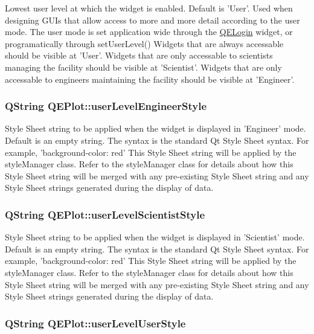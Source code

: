 Lowest user level at which the widget is enabled. Default is 'User'. Used when designing GUIs that allow access to more and more detail according to the user mode. The user mode is set application wide through the \hyperlink{classQELogin}{QELogin} widget, or programatically through setUserLevel() Widgets that are always accessable should be visible at 'User'. Widgets that are only accessable to scientists managing the facility should be visible at 'Scientist'. Widgets that are only accessable to engineers maintaining the facility should be visible at 'Engineer'. \hypertarget{classQEPlot_ad3827c125cb4f43a333b3cfbaa14bf16}{
\subsubsection[{userLevelEngineerStyle}]{\setlength{\rightskip}{0pt plus 5cm}QString QEPlot::userLevelEngineerStyle}}
\label{classQEPlot_ad3827c125cb4f43a333b3cfbaa14bf16}
Style Sheet string to be applied when the widget is displayed in 'Engineer' mode. Default is an empty string. The syntax is the standard Qt Style Sheet syntax. For example, 'background-\/color: red' This Style Sheet string will be applied by the styleManager class. Refer to the styleManager class for details about how this Style Sheet string will be merged with any pre-\/existing Style Sheet string and any Style Sheet strings generated during the display of data. \hypertarget{classQEPlot_a9c6651e019989197a0e952c8348e4215}{
\subsubsection[{userLevelScientistStyle}]{\setlength{\rightskip}{0pt plus 5cm}QString QEPlot::userLevelScientistStyle}}
\label{classQEPlot_a9c6651e019989197a0e952c8348e4215}
Style Sheet string to be applied when the widget is displayed in 'Scientist' mode. Default is an empty string. The syntax is the standard Qt Style Sheet syntax. For example, 'background-\/color: red' This Style Sheet string will be applied by the styleManager class. Refer to the styleManager class for details about how this Style Sheet string will be merged with any pre-\/existing Style Sheet string and any Style Sheet strings generated during the display of data. \hypertarget{classQEPlot_a65f72e73ac50f4a85fb5cce783299b49}{
\subsubsection[{userLevelUserStyle}]{\setlength{\rightskip}{0pt plus 5cm}QString QEPlot::userLevelUserStyle}}
